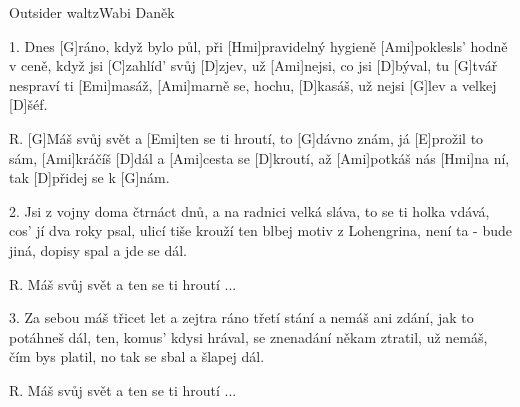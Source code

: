 \begin{song}{Outsider waltz}{Wabi Daněk}

\begin{xverse}{1. }
Dnes [G]ráno, když bylo půl, při [Hmi]pravidelný hygieně
[Ami]poklesls' hodně v ceně, když jsi [C]zahlíd' svůj [D]zjev,
už [Ami]nejsi, co jsi [D]býval, tu [G]tvář nespraví ti [Emi]masáž,
[Ami]marně se, hochu, [D]kasáš, už nejsi [G]lev a velkej [D]{}šéf.
\end{xverse}

\begin{xverse}{R. }
[G]Máš svůj svět a [Emi]ten se ti hroutí,
to [G]dávno znám, já [E]prožil to sám,
[Ami]kráčíš [D]dál a [Ami]cesta se [D]kroutí,
až [Ami]potkáš nás [Hmi]na ní, tak   [D]přidej se k [G]nám.
\end{xverse}

\begin{xverse}{2. }
Jsi z vojny doma čtrnáct dnů, a na radnici velká sláva,
to se ti holka vdává, cos' jí dva roky psal,
ulicí tiše krouží ten blbej motiv z Lohengrina,
není ta - bude jiná, dopisy spal a jde se dál.
\end{xverse}

\begin{xverse}{R. }
Máš svůj svět a ten se ti hroutí ...
\end{xverse}

\begin{xverse}{3. }
Za sebou máš třicet let a zejtra ráno třetí stání
a nemáš ani zdání, jak to potáhneš dál,
ten, komus' kdysi hrával, se znenadání někam ztratil,
už nemáš, čím bys platil, no tak se sbal a šlapej dál.
\end{xverse}

\begin{xverse}{R. }
Máš svůj svět a ten se ti hroutí ...
\end{xverse}

\end{song}

